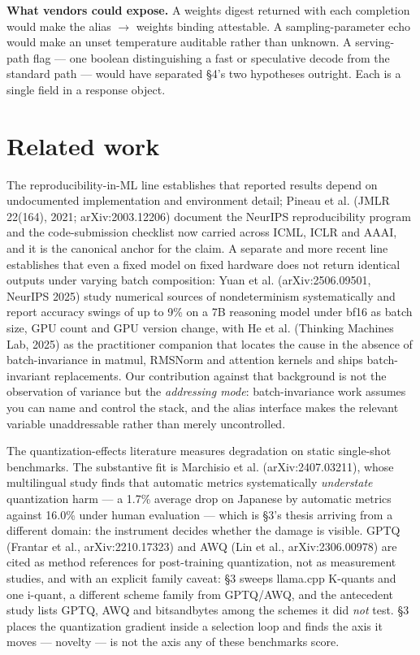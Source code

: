 \documentclass[11pt]{article}
\begin{document}
\textbf{What vendors could expose.} A weights digest returned with each completion would
make the alias $\rightarrow$ weights binding attestable. A sampling-parameter echo would make an
unset temperature auditable rather than unknown. A serving-path flag --- one boolean
distinguishing a fast or speculative decode from the standard path --- would have
separated \S4's two hypotheses outright. Each is a single field in a response object.

\section{Related work}

The reproducibility-in-ML line establishes that reported results depend on undocumented
implementation and environment detail; Pineau et al. (JMLR 22(164), 2021;
arXiv:2003.12206) document the NeurIPS reproducibility program and the code-submission
checklist now carried across ICML, ICLR and AAAI, and it is the canonical anchor for the
claim. A separate and more recent line establishes that even a fixed model on fixed
hardware does not return identical outputs under varying batch composition: Yuan et al.
(arXiv:2506.09501, NeurIPS 2025) study numerical sources of nondeterminism systematically
and report accuracy swings of up to 9\% on a 7B reasoning model under bf16 as batch size,
GPU count and GPU version change, with He et al. (Thinking Machines Lab, 2025) as the
practitioner companion that locates the cause in the absence of batch-invariance in
matmul, RMSNorm and attention kernels and ships batch-invariant replacements. Our
contribution against that background is not the observation of variance but the
\emph{addressing mode}: batch-invariance work assumes you can name and control the stack, and
the alias interface makes the relevant variable unaddressable rather than merely
uncontrolled.

The quantization-effects literature measures degradation on static single-shot benchmarks.
The substantive fit is Marchisio et al. (arXiv:2407.03211), whose multilingual study finds
that automatic metrics systematically \emph{understate} quantization harm --- a 1.7\% average drop
on Japanese by automatic metrics against 16.0\% under human evaluation --- which is \S3's
thesis arriving from a different domain: the instrument decides whether the damage is
visible. GPTQ (Frantar et al., arXiv:2210.17323) and AWQ (Lin et al., arXiv:2306.00978)
are cited as method references for post-training quantization, not as measurement studies,
and with an explicit family caveat: \S3 sweeps llama.cpp K-quants and one i-quant, a
different scheme family from GPTQ/AWQ, and the antecedent study lists GPTQ, AWQ and
bitsandbytes among the schemes it did \emph{not} test. \S3 places the quantization gradient
inside a selection loop and finds the axis it moves --- novelty --- is not the axis any of
these benchmarks score.
\end{document}
